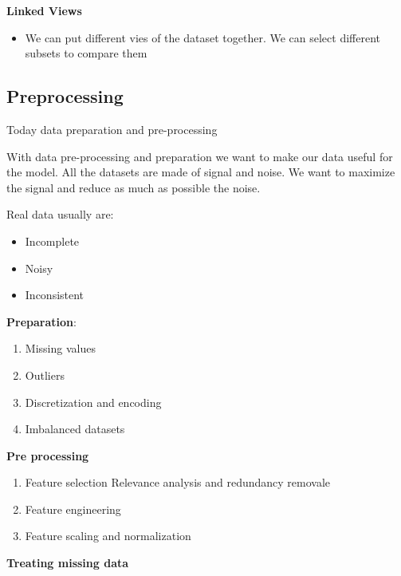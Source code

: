 \vspace{10pt}

\textbf{Linked Views}

\begin{itemize}
    \item We can put different vies of the dataset together. We can select different subsets to compare them
\end{itemize}

\subsection{Preprocessing}

Today data preparation and pre-processing

\vspace{10pt}

With data pre-processing and preparation we want to make our data useful for the model. All the datasets are made of signal and noise. We want to maximize the signal and reduce as much as possible the noise.

Real data usually are:
\begin{itemize}
    \item Incomplete
    \item Noisy
    \item Inconsistent
\end{itemize}

\vspace{10pt}


\textbf{Preparation}:
\begin{enumerate}
    \item Missing values
    \item Outliers
    \item Discretization and encoding
    \item Imbalanced datasets
\end{enumerate}

\textbf{Pre processing}

\begin{enumerate}
    \item Feature selection \ra Relevance analysis and redundancy removale
    \item Feature engineering
    \item Feature scaling and normalization
\end{enumerate}


\vspace{10pt}

\textbf{Treating missing data}

